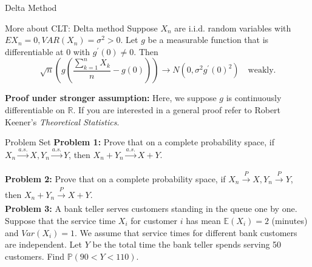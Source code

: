 \documentclass [aspectratio=169]{beamer}
\begin{document}
\begin{frame}{Delta Method}
    \begin{block}{More about CLT: Delta method}
    Suppose $X_n$ are i.i.d. random variables with $EX_n=0, VAR(X_n) = \sigma^2 >0$. Let $g$ be a measurable function that is differentiable at $0$ with $g^\prime(0) \neq 0$. Then
    \[
    \sqrt{n}\left(g\left(\frac{\sum_{k=1}^nX_k}{n} - g(0) \right)\right) \to N(0, \sigma^2g^\prime(0)^2) \quad \text{weakly.}
    \] 
    \end{block}
    \textbf{Proof under stronger assumption: } Here, we suppose $g$ is continuously differentiable on $\mathbb{R}$. If you are interested in a general proof refer to Robert Keener's \textit{Theoretical Statistics}.
    \vspace{1.8in}
\end{frame}


\begin{frame}{Problem Set}
    \textbf{Problem 1:}  Prove that on a complete probability space, if $X_n  \xrightarrow[]{a.s.} X, Y_n  \xrightarrow[]{a.s.} Y$, then $X_n + Y_n \xrightarrow[]{a.s.} X+Y$.\\
    \vspace{0.1in}
    
     \textbf{Problem 2:} Prove that on a complete probability space, if $X_n  \xrightarrow[]{P} X, Y_n  \xrightarrow[]{P} Y$, then $X_n + Y_n \xrightarrow[]{P} X+Y$.
    \vspace{0.1in}\\
    
    \textbf{Problem 3:} A bank teller serves customers standing in the queue one by one. Suppose that the service time $X_i$ for customer $i$ has mean $\mathbb{E}(X_i) = 2$ (minutes) and $Var(X_i) = 1$. We assume that service times for different bank customers are independent. Let $Y$ be the total time the bank teller spends serving 50 customers. Find $\mathbb{P}(90<Y<110)$.
    \vspace{0.1in}\\
   
\end{frame}
\end{document}
